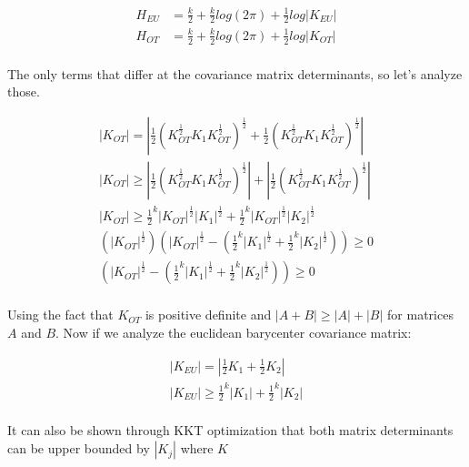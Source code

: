 \documentclass[12pt]{article}
\begin{document}
\begin{align}
    H_{EU} &= \frac{k}{2} + \frac{k}{2} log(2\pi) + \frac{1}{2} log{|K_{EU}|} \\
    H_{OT} &= \frac{k}{2} + \frac{k}{2} log(2\pi) + \frac{1}{2} log{|K_{OT}|} \\
\end{align}

The only terms that differ at the covariance matrix determinants, so let's analyze those.

\begin{eqnarray*}
    |K_{OT}| = |\frac{1}{2} (K_{OT}^{\frac{1}{2}}K_1K_{OT}^{\frac{1}{2}})^{\frac{1}{2}} +
                    \frac{1}{2} (K_{OT}^{\frac{1}{2}}K_1K_{OT}^{\frac{1}{2}})^{\frac{1}{2}}| \\
    |K_{OT}| \geq |\frac{1}{2} (K_{OT}^{\frac{1}{2}}K_1K_{OT}^{\frac{1}{2}})^{\frac{1}{2}}|
                    + |\frac{1}{2} (K_{OT}^{\frac{1}{2}}K_1K_{OT}^{\frac{1}{2}})^{\frac{1}{2}}| \\
    |K_{OT}| \geq \frac{1}{2}^{k} |K_{OT}|^{\frac{1}{2}}|K_1|^{\frac{1}{2}}
                        + \frac{1}{2}^{k} |K_{OT}|^{\frac{1}{2}}|K_2|^{\frac{1}{2}} \\
    (|K_{OT}|^{\frac{1}{2}})(|K_{OT}|^{\frac{1}{2}} - (\frac{1}{2}^{k} |K_1|^{\frac{1}{2}} + \frac{1}{2}^{k} |K_2|^{\frac{1}{2}})) \geq 0 \\
    (|K_{OT}|^{\frac{1}{2}} - (\frac{1}{2}^{k} |K_1|^{\frac{1}{2}} + \frac{1}{2}^{k} |K_2|^{\frac{1}{2}})) \geq 0 \\
\end{eqnarray*}

Using the fact that $K_{OT}$ is positive definite and $|A + B| \geq |A| + |B|$ for matrices $A$ and $B$. Now if we analyze
the euclidean barycenter covariance matrix:

\begin{eqnarray*}
    |K_{EU}| = |\frac{1}{2} K_1 + \frac{1}{2} K_2| \\
    |K_{EU}| \geq \frac{1}{2}^{k} |K_1| + \frac{1}{2}^{k} |K_2| \\
\end{eqnarray*}

It can also be shown through KKT optimization that both matrix determinants can be upper
bounded by $|K_j|$ where $K$
\end{document}
